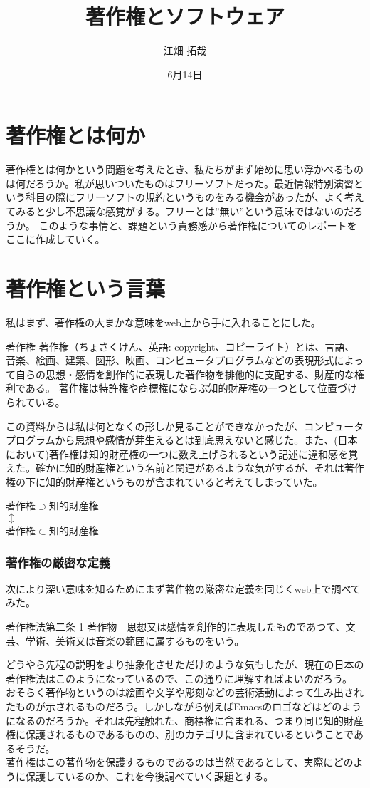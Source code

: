 \documentclass[a4j]{jsarticle}
\title{著作権とソフトウェア}
\author{江畑 拓哉}
\date{6月14日}
\begin{document}
\maketitle
\part{著作権とは何か}
著作権とは何かという問題を考えたとき、私たちがまず始めに思い浮かべるものは何だろうか。私が思いついたものはフリーソフトだった。最近情報特別演習という科目の際にフリーソフトの規約というものをみる機会があったが、よく考えてみると少し不思議な感覚がする。フリーとは”無い”という意味ではないのだろうか。
このような事情と、課題という責務感から著作権についてのレポートをここに作成していく。
\part{著作権という言葉}
私はまず、著作権の大まかな意味をweb上から手に入れることにした。
\begin{itembox}{著作権\cite{def_t}}
 著作権（ちょさくけん、英語: copyright、コピーライト）とは、言語、音楽、絵画、建築、図形、映画、コンピュータプログラムなどの表現形式によって自らの思想・感情を創作的に表現した著作物を排他的に支配する、財産的な権利である。 著作権は特許権や商標権にならぶ知的財産権の一つとして位置づけられている。
\end{itembox}
この資料からは私は何となくの形しか見ることができなかったが、コンピュータプログラムから思想や感情が芽生えるとは到底思えないと感じた。また、(日本において)著作権は知的財産権の一つに数え上げられるという記述に違和感を覚えた。確かに知的財産権という名前と関連があるような気がするが、それは著作権の下に知的財産権というものが含まれていると考えてしまっていた。
\begin{center}
 著作権$\supset$知的財産権\\
 $\updownarrow$ \\
 著作権$\subset$知的財産権
\end{center}
\section{著作権の厳密な定義}
次により深い意味を知るためにまず著作物の厳密な定義を同じくweb上で調べてみた。
\begin{itembox}{著作権法第二条 1\cite{def_t_r}}
 著作物　思想又は感情を創作的に表現したものであつて、文芸、学術、美術又は音楽の範囲に属するものをいう。
\end{itembox}
どうやら先程の説明をより抽象化させただけのような気もしたが、現在の日本の著作権法はこのようになっているので、この通りに理解すればよいのだろう。\\
おそらく著作物というのは絵画や文学や彫刻などの芸術活動によって生み出されたものが示されるものだろう。しかしながら例えばEmacsのロゴなどはどのようになるのだろうか。それは先程触れた、商標権に含まれる、つまり同じ知的財産権に保護されるものであるものの、別のカテゴリに含まれているということであるそうだ。\\
著作権はこの著作物を保護するものであるのは当然であるとして、実際にどのように保護しているのか、これを今後調べていく課題とする。
\end{document}
